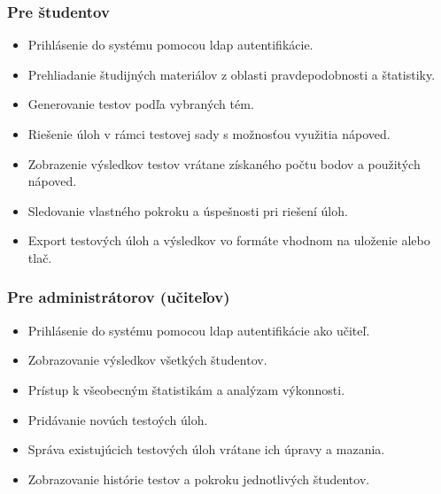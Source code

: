  \subsubsection{Pre študentov}
 \begin{itemize}
   \item Prihlásenie do systému pomocou \acrshort{ldap} autentifikácie.
   \item Prehliadanie študijných materiálov z oblasti pravdepodobnosti a štatistiky.
   \item Generovanie testov podľa vybraných tém.
   \item Riešenie úloh v rámci testovej sady s možnosťou využitia nápoved.
   \item Zobrazenie výsledkov testov vrátane získaného počtu bodov a použitých nápoved.
   \item Sledovanie vlastného pokroku a úspešnosti pri riešení úloh.
   \item Export testových úloh a výsledkov vo formáte vhodnom na uloženie alebo tlač.
 \end{itemize}
 
\subsubsection{Pre administrátorov (učiteľov)}
\begin{itemize}
  \item Prihlásenie do systému pomocou \acrshort{ldap} autentifikácie ako učiteľ.
\item Zobrazovanie výsledkov všetkých študentov.
\item Prístup k všeobecným štatistikám a analýzam výkonnosti.
\item Pridávanie novúch testoých úloh.
\item Správa existujúcich testových úloh vrátane ich úpravy a mazania.
\item Zobrazovanie histórie testov a pokroku jednotlivých študentov.
  \end{itemize}

